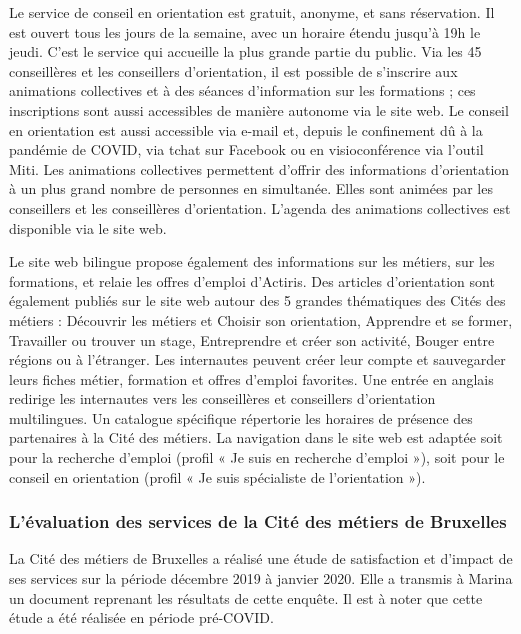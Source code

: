 \documentclass[french,a4paper,12pt]{article}
\begin{document}
{\quad Le service de conseil en orientation est gratuit, anonyme, et sans réservation. Il est ouvert tous les jours de la semaine, avec un horaire étendu jusqu’à 19h le jeudi. C’est le service qui accueille la plus grande partie du public. Via les 45 conseillères et les conseillers d’orientation, il est possible de s’inscrire aux animations collectives et à des séances d’information sur les formations ; ces inscriptions sont aussi accessibles de manière autonome via le site web. Le conseil en orientation est aussi accessible via e-mail et, depuis le confinement dû à la pandémie de COVID, via tchat sur Facebook ou en visioconférence via l’outil Miti.
Les animations collectives permettent d’offrir des informations d’orientation à un plus grand nombre de personnes en simultanée. Elles sont animées par les conseillers et les conseillères d’orientation. L’agenda des animations collectives est disponible via le site web.

\quad Le site web bilingue propose également des informations sur les métiers, sur les formations, et relaie les offres d’emploi d’Actiris. Des articles d’orientation sont également publiés sur le site web autour des 5 grandes thématiques des Cités des métiers : Découvrir les métiers et Choisir son orientation, Apprendre et se former, Travailler ou trouver un stage, Entreprendre et créer son activité, Bouger entre régions ou à l’étranger. Les internautes peuvent créer leur compte et sauvegarder leurs fiches métier, formation et offres d’emploi favorites. Une entrée en anglais redirige les internautes vers les conseillères et conseillers d’orientation multilingues. Un catalogue spécifique répertorie les horaires de présence des partenaires à la Cité des métiers. La navigation dans le site web est adaptée soit pour la recherche d’emploi (profil « Je suis en recherche d’emploi »), soit pour le conseil en orientation (profil « Je suis spécialiste de l’orientation »).

\subsubsection{L’évaluation des services de la Cité des métiers de Bruxelles}

\quad La Cité des métiers de Bruxelles a réalisé une étude de satisfaction et d’impact de ses services sur la période décembre 2019 à janvier 2020. Elle a transmis à Marina un document reprenant les résultats de cette enquête. Il est à noter que cette étude a été réalisée en période pré-COVID.

}
\end{document}

